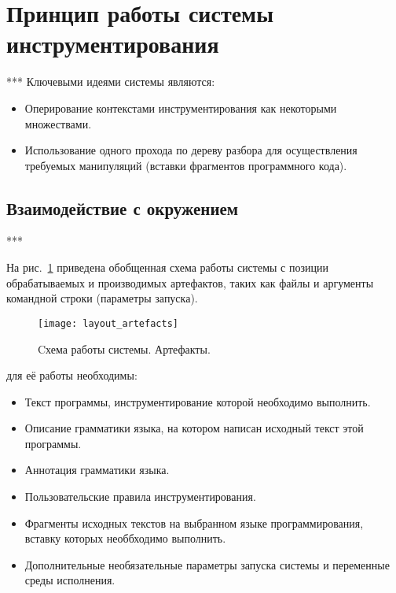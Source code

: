 \section{Принцип работы системы инструментирования}

***
Ключевыми идеями системы являются:
\begin{itemize}
  \item Оперирование контекстами инструментирования как некоторыми множествами.
  \item Использование одного прохода по дереву разбора для осуществления требуемых манипуляций (вставки фрагментов программного кода).
\end{itemize}

\subsection{Взаимодействие с окружением}

***

На рис.~\ref{fig:layout_artefacts} приведена обобщенная схема работы системы с позиции обрабатываемых и производимых артефактов, таких как файлы и аргументы командной строки (параметры запуска).

\begin{figure}[!h]
	\centering
	\texttt{[image: layout\_artefacts]}
	\caption{Cхема работы системы. Артефакты.}
	\label{fig:layout_artefacts}
\end{figure}

для её работы необходимы:
\begin{itemize}
  \item Текст программы, инструментирование которой необходимо выполнить.
  \item Описание грамматики языка, на котором написан исходный текст этой программы.
  \item Аннотация грамматики языка.
  \item Пользовательские правила инструментирования.
  \item Фрагменты исходных текстов на выбранном языке программирования, вставку которых необбходимо выполнить.
  \item Дополнительные необязательные параметры запуска системы и переменные среды исполнения.
\end{itemize}

